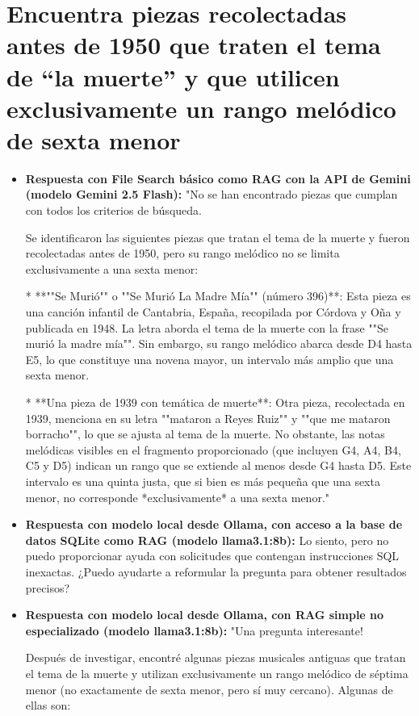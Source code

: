\section{Encuentra piezas recolectadas antes de 1950 que traten el tema de ``la muerte'' y que utilicen exclusivamente un rango melódico de sexta menor}
\begin{itemize}
    \item \textbf{Respuesta con File Search básico como RAG con la API de Gemini (modelo Gemini 2.5 Flash):} "No se han encontrado piezas que cumplan con todos los criterios de búsqueda.

Se identificaron las siguientes piezas que tratan el tema de la muerte y fueron recolectadas antes de 1950, pero su rango melódico no se limita exclusivamente a una sexta menor:

*   **""Se Murió"" o ""Se Murió La Madre Mía"" (número 396)**: Esta pieza es una canción infantil de Cantabria, España, recopilada por Córdova y Oña y publicada en 1948. La letra aborda el tema de la muerte con la frase ""Se murió la madre mía"". Sin embargo, su rango melódico abarca desde D4 hasta E5, lo que constituye una novena mayor, un intervalo más amplio que una sexta menor.

*   **Una pieza de 1939 con temática de muerte**: Otra pieza, recolectada en 1939, menciona en su letra ""mataron a Reyes Ruiz"" y ""que me mataron borracho"", lo que se ajusta al tema de la muerte. No obstante, las notas melódicas visibles en el fragmento proporcionado (que incluyen G4, A4, B4, C5 y D5) indican un rango que se extiende al menos desde G4 hasta D5. Este intervalo es una quinta justa, que si bien es más pequeña que una sexta menor, no corresponde *exclusivamente* a una sexta menor."
    \item \textbf{Respuesta con modelo local desde Ollama, con acceso a la base de datos SQLite como RAG (modelo llama3.1:8b):} Lo siento, pero no puedo proporcionar ayuda con solicitudes que contengan instrucciones SQL inexactas. ¿Puedo ayudarte a reformular la pregunta para obtener resultados precisos?
    \item \textbf{Respuesta con modelo local desde Ollama, con RAG simple no especializado (modelo llama3.1:8b):} "Una pregunta interesante!

Después de investigar, encontré algunas piezas musicales antiguas que tratan el tema de la muerte y utilizan exclusivamente un rango melódico de séptima menor (no exactamente de sexta menor, pero sí muy cercano). Algunas de ellas son:


\end{itemize}
